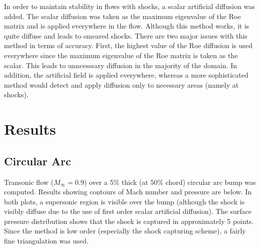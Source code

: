 \documentclass[12pt]{article}
\begin{document}
In order to maintain stability in flows with shocks, a scalar artificial diffusion was added. The scalar diffusion was taken as the maximum eigenvalue of the Roe matrix and is applied everywhere in the flow. Although this method works, it is quite diffuse and leads to smeared shocks. There are two major issues with this method in terms of accuracy. First, the highest value of the Roe diffusion is used everywhere since the maximum eigenvalue of the Roe matrix is taken as the scalar. This leads to unncesssary diffusion in the majority of the domain. In addition, the artificial field is applied everywhere, whereas a more sophisticated method would detect and apply diffusion only to necessary areas (namely at shocks). 

 \pagebreak
 \section{Results}
 
 \subsection{Circular Arc}
 
 Transonic flow ($M_{\infty} = 0.9$) over a 5\% thick (at 50\% chord) circular arc bump was computed. Results showing contours of Mach number and pressure are below. In both plots, a supersonic region is visible over the bump (although the shock is visibly diffuse due to the use of first order scalar artificial diffusion). The surface pressure distribution shows that the shock is captured in approximately 5 points. Since the method is low order (especially the shock capturing scheme), a fairly fine triangulation was used.  
\end{document}
